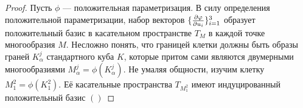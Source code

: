 \begin{proof}
	Пусть $\phi$ --- положительная параметризация. В силу определения положительной параметризации, набор векторов $\{\frac{\partial \varphi}{\partial u_i}\}_{i = 1}^3$ образует положительный базис в касательном пространстве $T_M$ в каждой точке многообразия $M$. Несложно понять, что границей клетки должны быть образы граней $K_\alpha^j$ стандартного куба $K$, которые притом сами являются двумерными многообразиями $M_\alpha^j = \phi(K_\alpha^j)$. Не умаляя общности, изучим клетку $M_1^2 = \phi(K_1^2)$. Её касательные пространства $T_{M_1^2}$ имеют индуцированный положительный базис $()$
\end{proof}